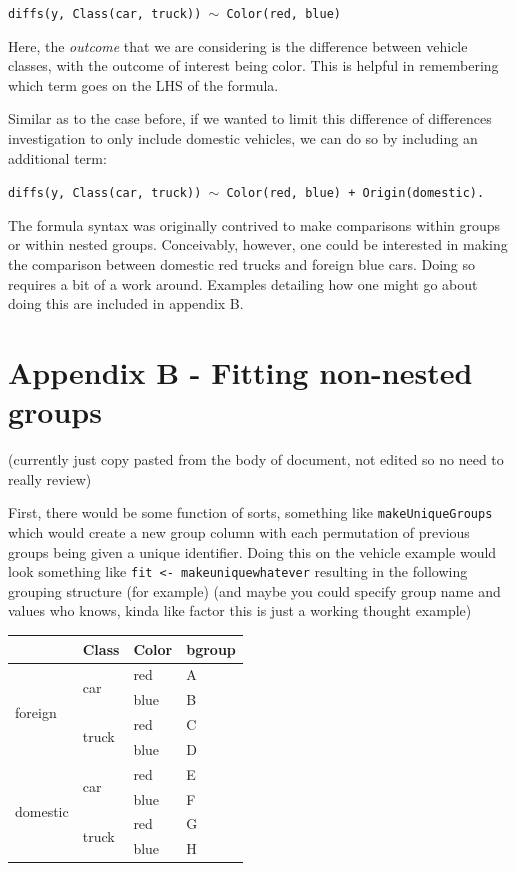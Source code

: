 \documentclass{article}
\newcommand{\xt}{\texttt}%
\begin{document}
\begin{center}
\tt diffs(y, Class(car, truck)) $\sim$ Color(red, blue)
\end{center}

Here, the \textit{outcome} that we are considering is the difference between vehicle classes, with the outcome of interest being color. This is helpful in remembering which term goes on the LHS of the formula. 

Similar as to the case before, if we wanted to limit this difference of differences investigation to only include domestic vehicles, we can do so by including an additional term:

\begin{center}
\tt diffs(y, Class(car, truck)) $\sim$ Color(red, blue) + Origin(domestic).
\end{center}

The formula syntax was originally contrived to make comparisons within groups or within nested groups. Conceivably, however, one could be interested in making the comparison between domestic red trucks and foreign blue cars. Doing so requires a bit of a work around. Examples detailing how one might go about doing this are included in appendix B. 

\section*{Appendix B - Fitting non-nested groups}

(currently just copy pasted from the body of document, not edited so no need to really review)

First, there would be some function of sorts, something like \xt{makeUniqueGroups} which would create a new group column with each permutation of previous groups being given a unique identifier. Doing this on the vehicle example would look something like \xt{fit <- makeuniquewhatever} resulting in the following grouping structure (for example) (and maybe you could specify group name and values who knows, kinda like factor this is just a working thought example)

\begin{center}

\begin{tabular}{|p{0.9in}|p{0.9in}|p{0.9in}|p{0.5in}|} \hline 
\rowcolor{lightgray} \multicolumn{1}{|c|}{Origin} & \multicolumn{1}{c|}{Class} & \multicolumn{1}{c|}{Color} & \multicolumn{1}{c|}{bgroup}\\
\hline
\multirow{4}{*}{foreign} & \multirow{2}{*}{car} & red & A\\
\hhline{~~--}
& & blue & B \\
\hhline{~---}
& \multirow{2}{*}{truck} & red & C\\
\hhline{~~--}
& & blue & D\\
\hline
\multirow{4}{*}{domestic} & \multirow{2}{*}{car} & red & E \\
\hhline{~~--}
& & blue & F\\
\hhline{~---}
& \multirow{2}{*}{truck} & red & G\\
\hhline{~~--}
& & blue & H\\
\hline
\end{tabular}
\end{center}
\end{document}
